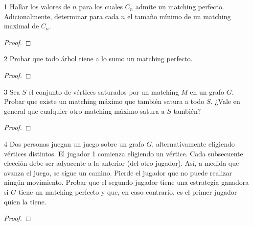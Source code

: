 \begin{ejercicio}{1}
    Hallar los valores de \( n \) para los cuales \( C_n \) admite un matching perfecto. Adicionalmente, determinar para cada \( n \) el tamaño mínimo de un matching maximal de \( C_n \).
\end{ejercicio}
\begin{proof}

\end{proof}

\vspace{0.5cm}

\begin{ejercicio}{2}
    Probar que todo árbol tiene a lo sumo un matching perfecto.
\end{ejercicio}
\begin{proof}

\end{proof}

\vspace{0.5cm}

\begin{ejercicio}{3}
    Sea \( S \) el conjunto de vértices saturados por un matching \( M \) en un grafo \( G \). Probar que existe un matching máximo que también satura a todo \( S \). ¿Vale en general que cualquier otro matching máximo satura a \( S \) también?
\end{ejercicio}
\begin{proof}

\end{proof}

\vspace{0.5cm}

\begin{ejercicio}{4}
    Dos personas juegan un juego sobre un grafo \( G \), alternativamente eligiendo vértices distintos. El jugador 1 comienza eligiendo un vértice. Cada subsecuente elección debe ser adyacente a la anterior (del otro jugador). Así, a medida que avanza el juego, se sigue un camino. Pierde el jugador que no puede realizar ningún movimiento. Probar que el segundo jugador tiene una estrategia ganadora si \( G \) tiene un matching perfecto y que, en caso contrario, es el primer jugador quien la tiene.
\end{ejercicio}
\begin{proof}

\end{proof}

\vspace{0.5cm}

